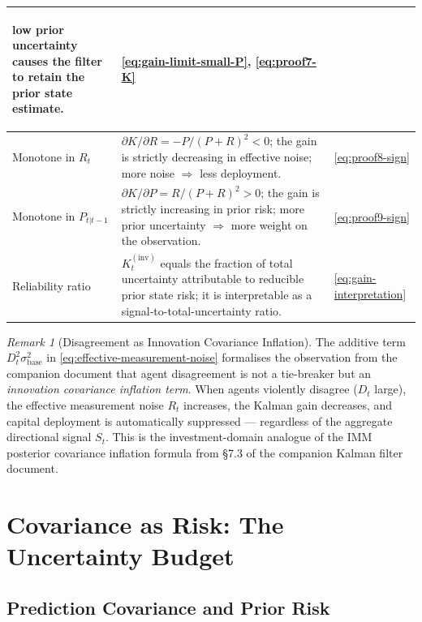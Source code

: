 \documentclass[12pt,openany]{book}
\numberwithin{equation}{chapter}
\theoremstyle{plain}
\theoremstyle{definition}
\theoremstyle{remark}
\newtheorem{remark}[theorem]{Remark}
\begin{document}
\begin{center}
\begin{tabularx}{\linewidth}{%
  >{\bfseries\raggedright\arraybackslash}p{3.8cm}
  >{\raggedright\arraybackslash}X
  >{\centering\arraybackslash}p{2.6cm}}
    low prior uncertainty causes the filter
    to retain the prior state estimate.
  & \eqref{eq:gain-limit-small-P},
    \eqref{eq:proof7-K} \\
\hline
Monotone in $R_t$
  & $\partial K / \partial R = -P/(P+R)^2 < 0$;
    the gain is strictly decreasing in effective
    noise; more noise $\Rightarrow$ less deployment.
  & \eqref{eq:proof8-sign} \\
\hline
Monotone in $P_{t|t-1}$
  & $\partial K / \partial P = R/(P+R)^2 > 0$;
    the gain is strictly increasing in prior risk;
    more prior uncertainty $\Rightarrow$ more
    weight on the observation.
  & \eqref{eq:proof9-sign} \\
\hline
Reliability ratio
  & $K_t^{(\mathrm{inv})}$ equals the fraction of
    total uncertainty attributable to reducible
    prior state risk; it is interpretable as a
    signal-to-total-uncertainty ratio.
  & \eqref{eq:gain-interpretation} \\
\hline
\end{tabularx}
\end{center}

\begin{remark}[Disagreement as Innovation Covariance Inflation]
\label{rem:disagreement-inflation}
The additive term $D_t^2 \sigma_{\mathrm{base}}^2$ in
\eqref{eq:effective-measurement-noise} formalises the observation
from the companion document that agent disagreement is not a
tie-breaker but an \emph{innovation covariance inflation term}.
When agents violently disagree ($D_t$ large), the effective
measurement noise $R_t$ increases, the Kalman gain decreases,
and capital deployment is automatically suppressed — regardless
of the aggregate directional signal $S_t$.  This is the
investment-domain analogue of the IMM posterior covariance
inflation formula from §7.3 of the companion Kalman filter
document.
\end{remark}

\chapter{Covariance as Risk: The Uncertainty Budget}
\label{ch:covariance}

\section{Prediction Covariance and Prior Risk}
\end{document}
